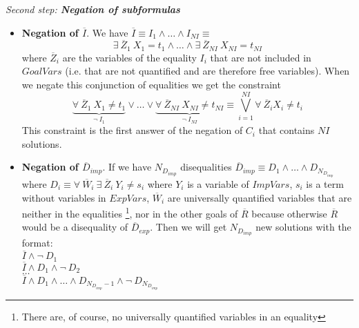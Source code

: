 \documentclass{llncs}
\begin{document}
\noindent
{\em Second step: {\bf Negation of subformulas}}

        \begin{itemize}

           \item {\bf Negation of $\overline{I}$}. We have $\overline{I}
           \equiv I_1 \wedge \ldots \wedge I_{NI} \equiv$ \[ \exists~
           \overline{Z}_1~ X_1 = t_1 \wedge \ldots \wedge \exists~
           \overline{Z}_{NI}~ X_{NI} = t_{NI} \] where
           $\overline{Z}_i$ are the variables of the equality $I_i$ that
           are not included in $GoalVars$ (i.e. that are not quantified
           and are therefore free variables). When we negate this
           conjunction of equalities we get the constraint 
                \[
           \underbrace{\forall~ \overline{Z}_1~ X_1 \neq t_1} _{\neg~
           I_1} \vee \ldots \vee \underbrace{\forall~
           \overline{Z}_{NI}~ X_{NI} \neq t_{NI} } _{\neg~ I_{NI}}
           \equiv %
           \bigvee_{i=1}^{NI} \forall~ \overline{Z}_i X_i
           \neq t_i \] 
           This constraint is the first answer of the
           negation of $C_i$ that contains $NI$ solutions.

           \item {\bf Negation of $\overline{D}_{imp}$}. If we have
           $N_{D_{imp}}$ disequalities $\overline{D}_{imp} \equiv D_1
           \wedge \ldots \wedge D_{N_{D_{imp}}}$ where $ D_i \equiv
           \forall~ \overline{W}_i ~ \exists~ \overline{Z}_i ~ Y_i
           \neq s_i$ where $Y_i$ is a variable of $ImpVars$, $s_i$ is
           a term without variables in $ExpVars$, $\overline{W}_i$ are
           universally quantified variables that are neither in the
           equalities \footnote{There are, of course, no universally
           quantified variables in an equality}, nor in the other
           goals of $\overline{R}$ because otherwise $\overline{R}$
           would be a disequality of $\overline{D}_{exp}$. Then we
           will get $N_{D_{imp}}$ new solutions with the format: \\

           $\overline{I} \wedge \neg~ D_1 $ \\ 
           $\overline{I} \wedge
           D_1 \wedge \neg~ D_2 $ \\ 
           $\ldots $ \\ 
           $\overline{I} \wedge
           D_1 \wedge \ldots \wedge D_{N_{D_{imp}}-1} \wedge \neg~
           D_{N_{D_{imp}}}$ \\ 


\end{itemize}
\end{document}
